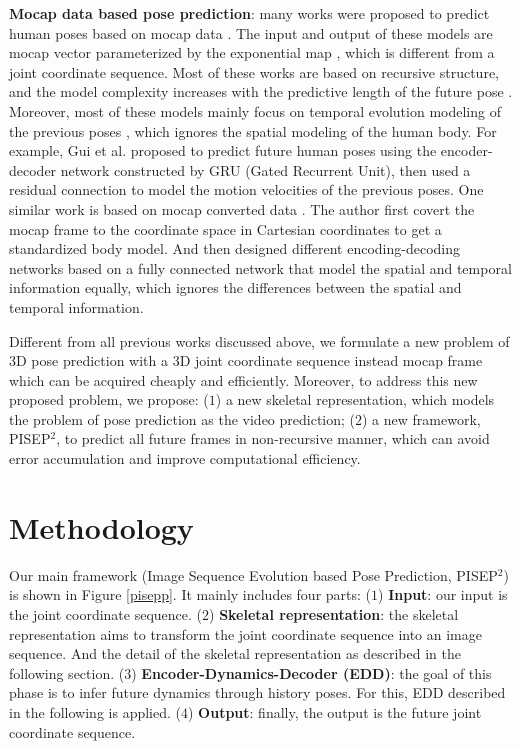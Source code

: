 \documentclass[journal]{IEEEtran}
\begin{document}
{\bf Mocap data based pose prediction}: many works were proposed to predict human poses based on mocap data \cite{ButepageDRL,Guifewshot,MartinezOMP,GuiAdversarial,TangLMP,tprnn,rnmhy,srnnap}. The input and output of these models are mocap vector parameterized by the exponential map \cite{TaylorMM,ppruem}, which is different from a joint coordinate sequence. Most of these works are based on recursive structure, and the model complexity increases with the predictive length of the future pose \cite{GuiAdversarial,TangLMP,rnmhy,srnnap,MartinezOMP,tprnn}. Moreover, most of these models mainly focus on temporal evolution modeling of the previous poses \cite{tprnn,MartinezOMP,rnmhy,srnnap}, which ignores the spatial modeling of the human body. For example, Gui et al.\cite{GuiAdversarial} proposed to predict future human poses using the encoder-decoder network constructed by GRU (Gated Recurrent Unit), then used a residual connection to model the motion velocities of the previous poses. One similar work is based on mocap converted data \cite{ButepageDRL}. The author first covert the mocap frame to the coordinate space in Cartesian coordinates to get a standardized body model. And then designed different encoding-decoding networks based on a fully connected network that model the spatial and temporal information equally, which ignores the differences between the spatial and temporal information.

Different from all previous works discussed above, we formulate a new problem of 3D pose prediction with a 3D joint coordinate sequence instead mocap frame which can be acquired cheaply and efficiently. Moreover, to address this new proposed problem, we propose: (${1}$) a new skeletal representation, which models the problem of pose prediction as the video prediction; (${2}$) a new framework, PISEP${^2}$, to predict all future frames in non-recursive manner, which can avoid error accumulation and improve computational efficiency.


\section{Methodology}
Our main framework (Image Sequence Evolution based Pose Prediction, PISEP${^2}$) is shown in Figure \ref{pisepp}. It mainly includes four parts: (${1}$) {\bf Input}: our input is the joint coordinate sequence. (${2}$) {\bf Skeletal representation}: the skeletal representation aims to transform the joint coordinate sequence into an image sequence. And the detail of the skeletal representation as described in the following section. (${3}$) {\bf Encoder-Dynamics-Decoder (EDD)}: the goal of this phase is to infer future dynamics through history poses. For this, EDD described in the following is applied. (${4}$) {\bf Output}: finally, the output is the future joint coordinate sequence.
\end{document}
